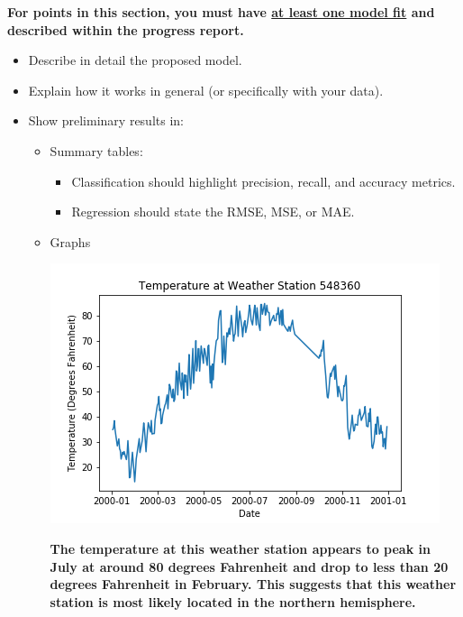 \documentclass[conference]{IEEEtran}
\begin{document}
\textbf{For points in this section, you must have \underline{at least one model fit} and described within the progress report.}

\begin{itemize}
  \item Describe in detail the proposed model.
  \item Explain how it works in general (or specifically with your data).
  \item Show preliminary results in:
  \begin{itemize}
    \item Summary tables:
    \begin{itemize}
      \item Classification should highlight precision, recall, and accuracy metrics.
      \item Regression should state the RMSE, MSE, or MAE.
    \end{itemize}
    \item Graphs

    \includegraphics[scale=0.5]{./temperature.png}

    \textbf{The temperature at this weather station appears to peak in July at around 80 degrees Fahrenheit and drop to less than 20 degrees Fahrenheit in February. This suggests that this weather station is most likely located in the northern hemisphere.} \\


\end{itemize}
\end{itemize}
\end{document}
